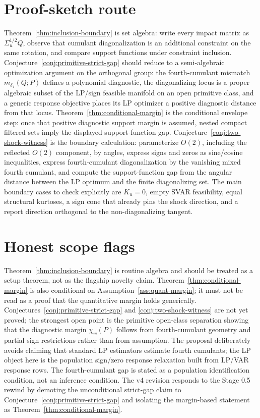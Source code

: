 \documentclass[11pt]{article}
\theoremstyle{definition}
\theoremstyle{plain}
\theoremstyle{remark}
\begin{document}
\section{Proof-sketch route}
Theorem~\ref{thm:inclusion-boundary} is set algebra: write every impact matrix as \(\Sigma_u^{1/2}Q\), observe that cumulant diagonalization is an additional constraint on the same rotation, and compare support functions under constraint inclusion.  Conjecture~\ref{conj:primitive-strict-gap} should reduce to a semi-algebraic optimization argument on the orthogonal group: the fourth-cumulant mismatch \(m_{\delta_4}(Q;P)\) defines a polynomial diagnostic, the diagonalizing locus is a proper algebraic subset of the LP/sign feasible manifold on an open primitive class, and a generic response objective places its LP optimizer a positive diagnostic distance from that locus.  Theorem~\ref{thm:conditional-margin} is the conditional envelope step: once that positive diagnostic support margin is assumed, nested compact filtered sets imply the displayed support-function gap.  Conjecture~\ref{conj:two-shock-witness} is the boundary calculation: parameterize \(O(2)\), including the reflected \(O(2)\) component, by angles, express signs and zeros as sine/cosine inequalities, express fourth-cumulant diagonalization by the vanishing mixed fourth cumulant, and compute the support-function gap from the angular distance between the LP optimum and the finite diagonalizing set.  The main boundary cases to check explicitly are \(K_u=0\), empty SVAR feasibility, equal structural kurtoses, a sign cone that already pins the shock direction, and a report direction orthogonal to the non-diagonalizing tangent.

\section{Honest scope flags}
Theorem~\ref{thm:inclusion-boundary} is routine algebra and should be treated as a setup theorem, not as the flagship novelty claim.  Theorem~\ref{thm:conditional-margin} is also conditional on Assumption~\ref{ass:quant-margin}; it must not be read as a proof that the quantitative margin holds generically.  Conjectures~\ref{conj:primitive-strict-gap} and \ref{conj:two-shock-witness} are not yet proved; the strongest open point is the primitive open-class separation showing that the diagnostic margin \(\chi_w(P)\) follows from fourth-cumulant geometry and partial sign restrictions rather than from assumption.  The proposal deliberately avoids claiming that standard LP estimators estimate fourth cumulants; the LP object here is the population sign/zero response relaxation built from LP/VAR response rows.  The fourth-cumulant gap is stated as a population identification condition, not an inference condition.  The v4 revision responds to the Stage 0.5 rewind by demoting the unconditional strict-gap claim to Conjecture~\ref{conj:primitive-strict-gap} and isolating the margin-based statement as Theorem~\ref{thm:conditional-margin}.
\end{document}
